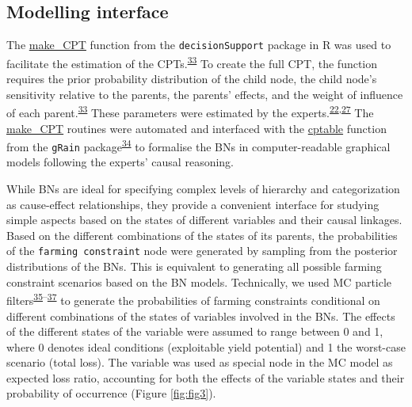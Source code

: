 \documentclass[]{elsarticle} %
\begin{document}
\hypertarget{ref35}{%
\subsection{Modelling interface}\label{ref35}}

The \href{https://www.rdocumentation.org/packages/decisionSupport/versions/1.103.8/topics/make_CPT}{make\_CPT} function from the \texttt{decisionSupport} package in R was used to facilitate the estimation of the CPTs.\textsuperscript{\protect\hyperlink{ref-Luedeling_Goehring_et_al_2019}{33}} To create the full CPT, the function requires the prior probability distribution of the child node, the child node's sensitivity relative to the parents, the parents' effects, and the weight of influence of each parent.\textsuperscript{\protect\hyperlink{ref-Luedeling_Goehring_et_al_2019}{33}} These parameters were estimated by the experts.\textsuperscript{\protect\hyperlink{ref-Whitney_Shepherd_et_al_2018}{22},\protect\hyperlink{ref-Hansson_and_Sjokvist_2013}{27}} The \href{https://www.rdocumentation.org/packages/decisionSupport/versions/1.103.8/topics/make_CPT}{make\_CPT} routines were automated and interfaced with the \href{https://www.google.com/search?client=firefox-b-d\&q=cptable}{cptable} function from the \texttt{gRain} package\textsuperscript{\protect\hyperlink{ref-Hojsgaard_2012}{34}} to formalise the BNs in computer-readable graphical models following the experts' causal reasoning.

While BNs are ideal for specifying complex levels of hierarchy and categorization as cause-effect relationships, they provide a convenient interface for studying simple aspects based on the states of different variables and their causal linkages. Based on the different combinations of the states of its parents, the probabilities of the \texttt{farming\ constraint} node were generated by sampling from the posterior distributions of the BNs. This is equivalent to generating all possible farming constraint scenarios based on the BN models. Technically, we used MC particle filters\textsuperscript{\protect\hyperlink{ref-Kitagawa_2016}{35}--\protect\hyperlink{ref-Scutari_2010}{37}} to generate the probabilities of farming constraints conditional on different combinations of the states of variables involved in the BNs. The effects of the different states of the variable were assumed to range between 0 and 1, where 0 denotes ideal conditions (exploitable yield potential) and 1 the worst-case scenario (total loss). The variable was used as special node in the MC model as expected loss ratio, accounting for both the effects of the variable states and their probability of occurrence (Figure \ref{fig:fig3}).
\end{document}
